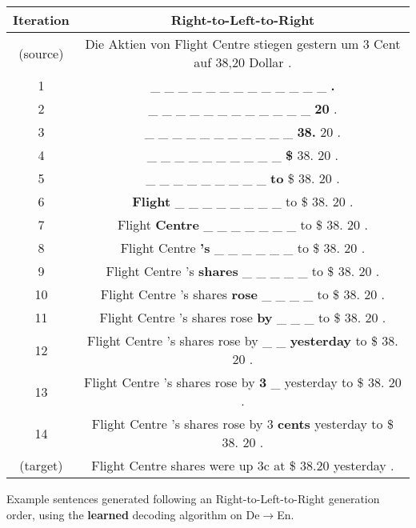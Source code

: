 \centering
\footnotesize
\begin{tabular}{cc}
\toprule
Iteration & {\color{blue} Right-to-Left-to-Right} \\
\midrule
(source) & Die Aktien von Flight Centre stiegen gestern um 3 Cent auf 38,20 Dollar .\\
1 & \_ \_ \_ \_ \_ \_ \_ \_ \_ \_ \_ \_ \_ \textbf{.} \\
2 & \_ \_ \_ \_ \_ \_ \_ \_ \_ \_ \_ \_ \textbf{20} . \\
3 & \_ \_ \_ \_ \_ \_ \_ \_ \_ \_ \_ \textbf{38.} 20 . \\
4 & \_ \_ \_ \_ \_ \_ \_ \_ \_ \_ \textbf{\$} 38. 20 . \\
5 & \_ \_ \_ \_ \_ \_ \_ \_ \_ \textbf{to} \$ 38. 20 . \\
6 & \textbf{Flight} \_ \_ \_ \_ \_ \_ \_ \_ to \$ 38. 20 . \\
7 & Flight \textbf{Centre} \_ \_ \_ \_ \_ \_ \_ to \$ 38. 20 . \\
8 & Flight Centre \textbf{'s} \_ \_ \_ \_ \_ \_ to \$ 38. 20 . \\
9 & Flight Centre 's \textbf{shares} \_ \_ \_ \_ \_ to \$ 38. 20 . \\
10 & Flight Centre 's shares \textbf{rose} \_ \_ \_ \_ to \$ 38. 20 . \\
11 & Flight Centre 's shares rose \textbf{by} \_ \_ \_ to \$ 38. 20 . \\
12 & Flight Centre 's shares rose by \_ \_ \textbf{yesterday} to \$ 38. 20 . \\
13 & Flight Centre 's shares rose by \textbf{3} \_ yesterday to \$ 38. 20 . \\
14 & Flight Centre 's shares rose by 3 \textbf{cents} yesterday to \$ 38. 20 . \\
(target) & Flight Centre shares were up 3c at \$ 38.20 yesterday . \\

\bottomrule
\end{tabular}

\caption{Example sentences generated following an {\color{blue} Right-to-Left-to-Right} generation order, using the \textbf{learned} decoding algorithm on De$\rightarrow$En.}